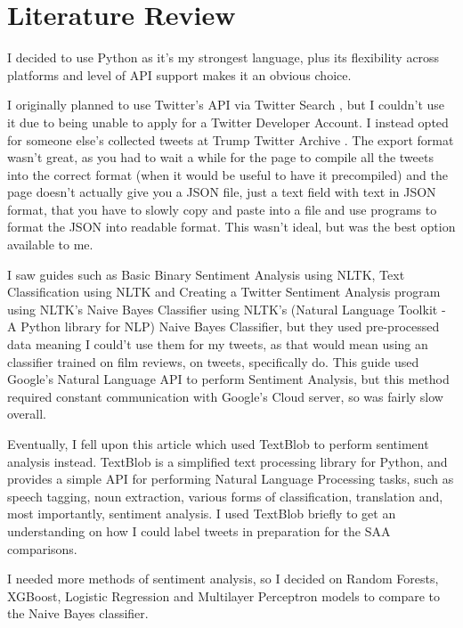 \documentclass{article}
\begin{document}
\newpage
\section{Literature Review}

I decided to use Python as it's my strongest language, plus its flexibility across platforms and level of API support makes it an obvious choice.

I originally planned to use Twitter's API via Twitter Search \autocite[3]{ckoepp_2018}, but I couldn't use it due to being unable to apply for a Twitter Developer Account.
I instead opted for someone else's collected tweets at Trump Twitter Archive \autocite[3]{trump_archive}.
The export format wasn't great, as you had to wait a while for the page to compile all the tweets into the correct format (when it would be useful to have it precompiled) and the page doesn't actually give you a JSON file, just a text field with text in JSON format, that you have to slowly copy and paste into a file and use programs to format the JSON into readable format.
This wasn't ideal, but was the best option available to me.

I saw guides such as Basic Binary Sentiment Analysis using NLTK\autocite[3]{munir_2019}, Text Classification using NLTK\autocite[3]{python_tutorial} and Creating a Twitter Sentiment Analysis program using NLTK's Naive Bayes Classifier\autocite[3]{al-masri_2019} using NLTK's (Natural Language Toolkit - A Python library for NLP) Naive Bayes Classifier, but they used pre-processed data meaning I could't use them for my tweets, as that would mean using an classifier trained on film reviews, on tweets, specifically do.
This guide\autocite[3]{putra_2019} used Google's Natural Language API to perform Sentiment Analysis, but this method required constant communication with Google's Cloud server, so was fairly slow overall.

Eventually, I fell upon this article\autocite[3]{geeksforgeeks_2020} which used TextBlob to perform sentiment analysis instead.
TextBlob is a simplified text processing library for Python, and provides a simple API for performing Natural Language Processing tasks, such as speech tagging, noun extraction, various forms of classification, translation and, most importantly, sentiment analysis.
I used TextBlob briefly to get an understanding on how I could label tweets in preparation for the SAA comparisons.

I needed more methods of sentiment analysis, so I decided on Random Forests, XGBoost\autocite[4]{xgboost_tutorial}, Logistic Regression and Multilayer Perceptron models to compare to the Naive Bayes classifier.
\end{document}
